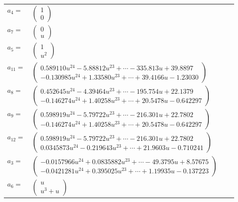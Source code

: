 \documentclass[1p]{elsarticle_modified}
\theoremstyle{definition}
\begin{document}
\begin{tabular}{m{7pt} m{180pt} m{7pt} m{180pt} }
\flushright $a_{4}=$&$\begin{pmatrix}1\\0\end{pmatrix}$ \\
\flushright $a_{7}=$&$\begin{pmatrix}0\\u\end{pmatrix}$ \\
\flushright $a_{5}=$&$\begin{pmatrix}1\\u^2\end{pmatrix}$ \\
\flushright $a_{11}=$&$\begin{pmatrix}0.589110 u^{24}-5.88812 u^{23}+\cdots-335.813 u+39.8897\\-0.130985 u^{24}+1.33580 u^{23}+\cdots+39.4166 u-1.23030\end{pmatrix}$ \\
\flushright $a_{8}=$&$\begin{pmatrix}0.452645 u^{24}-4.39464 u^{23}+\cdots-195.754 u+22.1379\\-0.146274 u^{24}+1.40258 u^{23}+\cdots+20.5478 u-0.642297\end{pmatrix}$ \\
\flushright $a_{9}=$&$\begin{pmatrix}0.598919 u^{24}-5.79722 u^{23}+\cdots-216.301 u+22.7802\\-0.146274 u^{24}+1.40258 u^{23}+\cdots+20.5478 u-0.642297\end{pmatrix}$ \\
\flushright $a_{12}=$&$\begin{pmatrix}0.598919 u^{24}-5.79722 u^{23}+\cdots-216.301 u+22.7802\\0.0345873 u^{24}-0.219643 u^{23}+\cdots+21.9603 u-0.710241\end{pmatrix}$ \\
\flushright $a_{3}=$&$\begin{pmatrix}-0.0157966 u^{24}+0.0835882 u^{23}+\cdots-49.3795 u+8.57675\\-0.0421281 u^{24}+0.395025 u^{23}+\cdots+1.19935 u-0.137223\end{pmatrix}$ \\
\flushright $a_{6}=$&$\begin{pmatrix}u\\u^3+u\end{pmatrix}$ \\

\end{tabular}
\end{document}
